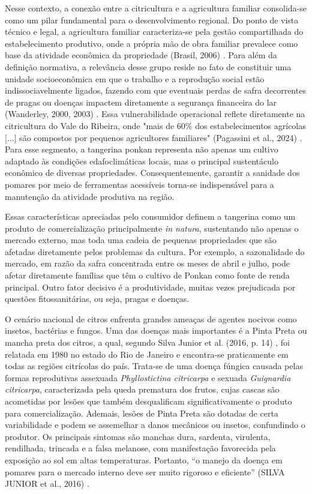 \documentclass[11pt,a4paper]{article}
\begin{document}
Nesse contexto, a conexão entre a citricultura e a agricultura familiar consolida-se como um pilar fundamental para o desenvolvimento regional. Do ponto de vista técnico e legal, a agricultura familiar caracteriza-se pela gestão compartilhada do estabelecimento produtivo, onde a própria mão de obra familiar prevalece como base da atividade econômica da propriedade (Brasil, 2006) \cite{Brasil2006}. Para além da definição normativa, a relevância desse grupo reside no fato de constituir uma unidade socioeconômica em que o trabalho e a reprodução social estão indissociavelmente ligados, fazendo com que eventuais perdas de safra decorrentes de pragas ou doenças impactem diretamente a segurança financeira do lar (Wanderley, 2000, 2003) \cite{Wanderley2000} \cite{Wanderley2003}. Essa vulnerabilidade operacional reflete diretamente na citricultura do Vale do Ribeira, onde "mais de 60\% dos estabelecimentos agrícolas [...] são compostos por pequenos agricultores familiares" (Pagassini et al., 2024) \cite{Pagassini2024}. Para esse segmento, a tangerina ponkan representa não apenas um cultivo adaptado às condições edafoclimáticas locais, mas o principal sustentáculo econômico de diversas propriedades. Consequentemente, garantir a sanidade dos pomares por meio de ferramentas acessíveis torna-se indispensável para a manutenção da atividade produtiva na região.

Essas características apreciadas pelo consumidor definem a tangerina como um produto de comercialização principalmente \emph{in natura}, sustentando não apenas o mercado externo, mas toda uma cadeia de pequenas propriedades que são afetadas diretamente pelos problemas da cultura. Por exemplo, a sazonalidade do mercado, em razão da safra concentrada entre os meses de abril e julho, pode afetar diretamente famílias que têm o cultivo de Ponkan como fonte de renda principal. Outro fator decisivo é a produtividade, muitas vezes prejudicada por questões fitossanitárias, ou seja, pragas e doenças. 

O cenário nacional de citros enfrenta grandes ameaças de agentes nocivos como insetos, bactérias e fungos. Uma das doenças mais importantes é a Pinta Preta ou mancha preta dos citros, a qual, segundo Silva Junior et al. (2016, p. 14) \cite{SilvaJunior2016}, foi relatada em 1980 no estado do Rio de Janeiro e encontra-se praticamente em todas as regiões citrícolas do país. Trata-se de uma doença fúngica causada pelas formas reprodutivas assexuada \emph{Phyllostictina citricarpa} e sexuada \emph{Guignardia citricarpa}, caracterizada pela queda prematura dos frutos, cujas cascas são acometidas por lesões que também desqualificam significativamente o produto para comercialização. Ademais, lesões de Pinta Preta são dotadas de certa variabilidade e podem se assemelhar a danos mecânicos ou insetos, confundindo o produtor. Os principais sintomas são manchas dura, sardenta, virulenta, rendilhada, trincada e a falsa melanose, com manifestação favorecida pela exposição ao sol em altas temperaturas. Portanto, “o manejo da doença em pomares para o mercado interno deve ser muito rigoroso e eficiente” (SILVA JUNIOR et al., 2016) \cite{SilvaJunior2016}.
\end{document}
